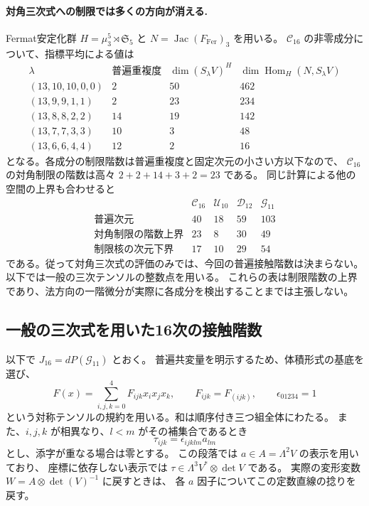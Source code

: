 \paragraph{対角三次式への制限では多くの方向が消える.}
Fermat安定化群 $H=\mu_3^5\rtimes\mathfrak S_5$ と
$N=\operatorname{Jac}(F_{\mathrm{Fer}})_3$ を用いる。
$\mathcal C_{16}$ の非零成分について、指標平均による値は
\[
\begin{array}{c|r|r|r}
 \lambda&\text{普遍重複度}&\dim(S_\lambda V)^H
         &\dim\operatorname{Hom}_H(N,S_\lambda V)\\\hline
 (13,10,10,0,0)&2&50&462\\
 (13,9,9,1,1)&2&23&234\\
 (13,8,8,2,2)&14&19&142\\
 (13,7,7,3,3)&10&3&48\\
 (13,6,6,4,4)&12&2&16
\end{array}
\]
となる。各成分の制限階数は普遍重複度と固定次元の小さい方以下なので、
$\mathcal C_{16}$ の対角制限の階数は高々 $2+2+14+3+2=23$ である。
同じ計算による他の空間の上界も合わせると
\[
\begin{array}{c|rrrr}
 &\mathcal C_{16}&\mathcal U_{10}&\mathcal D_{12}&\mathcal G_{11}\\\hline
 \text{普遍次元}&40&18&59&103\\
 \text{対角制限の階数上界}&23&8&30&49\\
 \text{制限核の次元下界}&17&10&29&54
\end{array}
\]
である。従って対角三次式の評価のみでは、今回の普遍接触階数は決まらない。
以下では一般の三次テンソルの整数点を用いる。
これらの表は制限階数の上界であり、法方向の一階微分が実際に各成分を検出することまでは主張しない。

\subsection{一般の三次式を用いた16次の接触階数}
\label{subsec:v13-sixteenth-tensor-rank}

以下で $J_{16}=dP(\mathcal G_{11})$ とおく。
普遍共変量を明示するため、体積形式の基底を選び、
\[
 F(x)=\sum_{i,j,k=0}^4 F_{ijk}x_ix_jx_k,\qquad F_{ijk}=F_{(ijk)},
 \qquad \epsilon_{01234}=1
\]
という対称テンソルの規約を用いる。和は順序付き三つ組全体にわたる。
また、$i,j,k$ が相異なり、$l<m$ がその補集合であるとき
\[
 \tau_{ijk}=\epsilon_{ijklm}a_{lm}
\]
とし、添字が重なる場合は零とする。
この段落では $a\in A=\Lambda^2V$ の表示を用いており、
座標に依存しない表示では
$\tau\in\Lambda^3V^*\otimes\det V$ である。
実際の変形変数 $W=A\otimes\det(V)^{-1}$ に戻すときは、
各 $a$ 因子についてこの定数直線の捻りを戻す。

